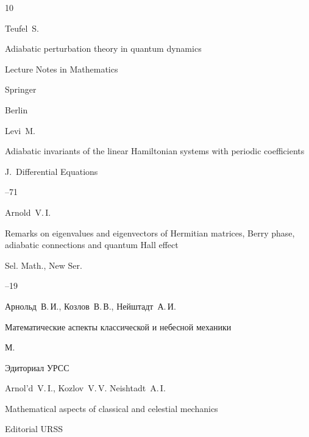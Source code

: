 \begin{thebibliography}{10}




\by Teufel~S.

\book Adiabatic perturbation theory in quantum dynamics

\serial Lecture Notes in Mathematics


\publ Springer 

\publaddr Berlin






\by Levi~M.

\paper Adiabatic invariants of the linear Hamiltonian systems with periodic coefficients

\jour J.~Differential Equations



--71





\by Arnold~V.\,I.

\paper Remarks on eigenvalues and eigenvectors of Hermitian matrices, Berry phase, adiabatic connections and quantum Hall effect

\jour Sel. Math., New Ser. 



--19





\by Арнольд~В.\,И., Козлов~В.\,В., Нейштадт~А.\,И.

\book Математические аспекты классической и небесной механики

\publaddr М.

\publ Эдиториал УРСС



\misctransl

\by Arnol'd~V.\,I., Kozlov~V.\,V. Neishtadt~A.\,I.

\book Mathematical aspects of classical and celestial mechanics

\publ Editorial URSS


\end{thebibliography}
